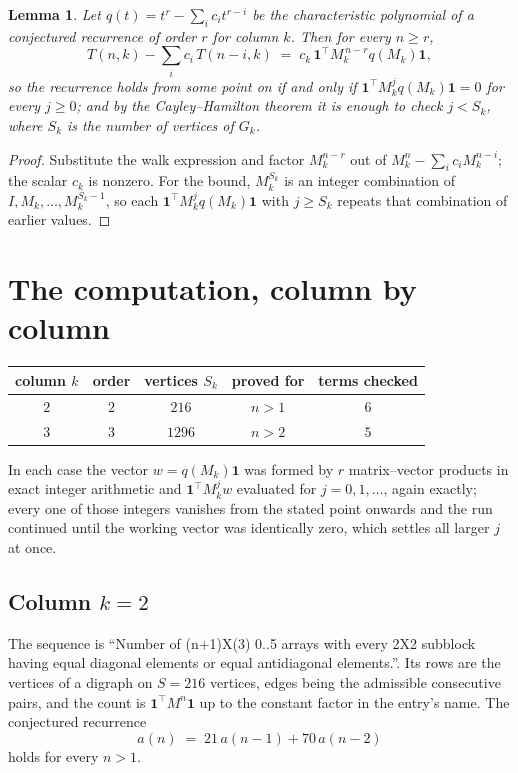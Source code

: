 \documentclass[11pt,a4paper]{article}
\theoremstyle{plain}
\newtheorem{lemma}[theorem]{Lemma}
\theoremstyle{definition}
\begin{document}
\begin{lemma}\label{lem:crit}
Let $q(t)=t^{r}-\sum_i c_it^{r-i}$ be the characteristic polynomial of a conjectured
recurrence of order $r$ for column $k$. Then for every $n\ge r$,
\[
T(n,k)-\sum_i c_i\,T(n-i,k)\;=\;c_k\,\mathbf{1}^{\!\top}M_k^{\,n-r}q(M_k)\mathbf{1},
\]
so the recurrence holds from some point on if and only if
$\mathbf{1}^{\!\top}M_k^{j}q(M_k)\mathbf{1}=0$ for every $j\ge0$; and by the
Cayley--Hamilton theorem it is enough to check $j<S_k$, where $S_k$ is the number of vertices
of $G_k$.
\end{lemma}

\begin{proof}
Substitute the walk expression and factor $M_k^{n-r}$ out of $M_k^{n}-\sum_ic_iM_k^{n-i}$;
the scalar $c_k$ is nonzero. For the bound, $M_k^{S_k}$ is an integer combination of
$I,M_k,\dots,M_k^{S_k-1}$, so each $\mathbf{1}^{\!\top}M_k^{j}q(M_k)\mathbf{1}$ with
$j\ge S_k$ repeats that combination of earlier values.
\end{proof}

\section{The computation, column by column}

\begin{center}
\begin{tabular}{ccccc}
column $k$ & order & vertices $S_k$ & proved for & terms checked \\ \hline
$2$ & $2$ & $216$ & $n>1$ & $6$ \\
$3$ & $3$ & $1296$ & $n>2$ & $5$ \\
\end{tabular}
\end{center}

In each case the vector $w=q(M_k)\mathbf{1}$ was formed by $r$ matrix--vector products in
exact integer arithmetic and $\mathbf{1}^{\!\top}M_k^{j}w$ evaluated for $j=0,1,\dots$,
again exactly; every one of those integers vanishes from the stated point onwards and the run
continued until the working vector was identically zero, which settles all larger $j$ at once.

\subsection*{Column $k=2$}
The sequence is ``Number of (n+1)X(3) 0..5 arrays with every 2X2 subblock having equal diagonal elements or equal antidiagonal elements.''. Its rows are the vertices of a digraph on
$S=216$ vertices, edges being the admissible consecutive pairs, and the count is
$\mathbf{1}^{\!\top}M^{n}\mathbf{1}$ up to the constant factor in the entry's name.
The conjectured recurrence
\[
a(n)\;=\;21\,a(n-1) + 70\,a(n-2)
\]
holds for every $n>1$.
\end{document}
